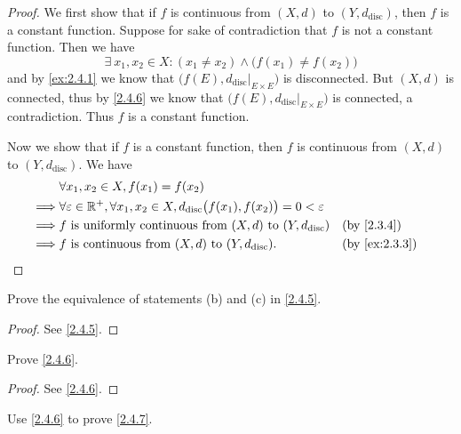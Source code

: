 \begin{proof}
  We first show that if \(f\) is continuous from \((X, d)\) to \((Y, d_{\text{disc}})\), then \(f\) is a constant function.
  Suppose for sake of contradiction that \(f\) is not a constant function.
  Then we have
  \[
    \exists\ x_1, x_2 \in X : (x_1 \neq x_2) \land \big(f(x_1) \neq f(x_2)\big)
  \]
  and by \cref{ex:2.4.1} we know that \(\big(f(E), d_{\text{disc}}|_{E \times E}\big)\) is disconnected.
  But \((X, d)\) is connected, thus by \cref{2.4.6} we know that \(\big(f(E), d_{\text{disc}}|_{E \times E}\big)\) is connected, a contradiction.
  Thus \(f\) is a constant function.

  Now we show that if \(f\) is a constant function, then \(f\) is continuous from \((X, d)\) to \((Y, d_{\text{disc}})\).
  We have
  \begin{align*}
             & \forall x_1, x_2 \in X, f(x_1) = f(x_2)                                                                                                          \\
    \implies & \forall \varepsilon \in \R^+, \forall x_1, x_2 \in X, d_{\text{disc}}\big(f(x_1), f(x_2)\big) = 0 < \varepsilon                                  \\
    \implies & f \text{ is uniformly continuous from } (X, d) \text{ to } (Y, d_{\text{disc}})                                 &  & \text{(by \cref{2.3.4})}    \\
    \implies & f \text{ is continuous from } (X, d) \text{ to } (Y, d_{\text{disc}}).                                          &  & \text{(by \cref{ex:2.3.3})}
  \end{align*}
\end{proof}

\begin{ex}\label{ex:2.4.3}
  Prove the equivalence of statements (b) and (c) in \cref{2.4.5}.
\end{ex}

\begin{proof}
  See \cref{2.4.5}.
\end{proof}

\begin{ex}\label{ex:2.4.4}
  Prove \cref{2.4.6}.
\end{ex}

\begin{proof}
  See \cref{2.4.6}.
\end{proof}

\begin{ex}\label{ex:2.4.5}
  Use \cref{2.4.6} to prove \cref{2.4.7}.
\end{ex}

